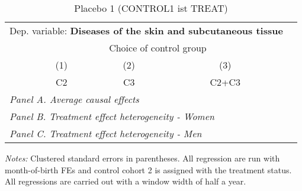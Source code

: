  \begin{table}[H] \centering \begin{threeparttable} \caption{Placebo 1 (CONTROL1 ist TREAT) } {\def\sym#1{\ifmmode^{#1}\else\(^{#1}\)\fi} \begin{tabular}{l*{4}{c}} \toprule \multicolumn{4}{l}{Dep. variable: \textbf{Diseases of the skin and subcutaneous tissue}} \\ & \multicolumn{3}{c}{Choice of control group} \\ \cmidrule(lr){2-4}
            &\multicolumn{1}{c}{(1)}&\multicolumn{1}{c}{(2)}&\multicolumn{1}{c}{(3)}\\
            &\multicolumn{1}{c}{C2}&\multicolumn{1}{c}{C3}&\multicolumn{1}{c}{C2+C3}\\
\midrule
 \multicolumn{4}{l}{\emph{Panel A. Average causal effects}} \\      \midrule\multicolumn{4}{l}{\emph{Panel B. Treatment effect heterogeneity - Women}} \\      \midrule\multicolumn{4}{l}{\emph{Panel C. Treatment effect heterogeneity - Men}} \\      
\bottomrule \end{tabular} } \begin{tablenotes} \item \scriptsize \emph{Notes:} Clustered standard errors in parentheses. All regression are run with month-of-birth FEs and control cohort 2 is assigned with the treatment status. All regressions are carried out with a window width of half a year. \end{tablenotes} \end{threeparttable} \end{table} 
